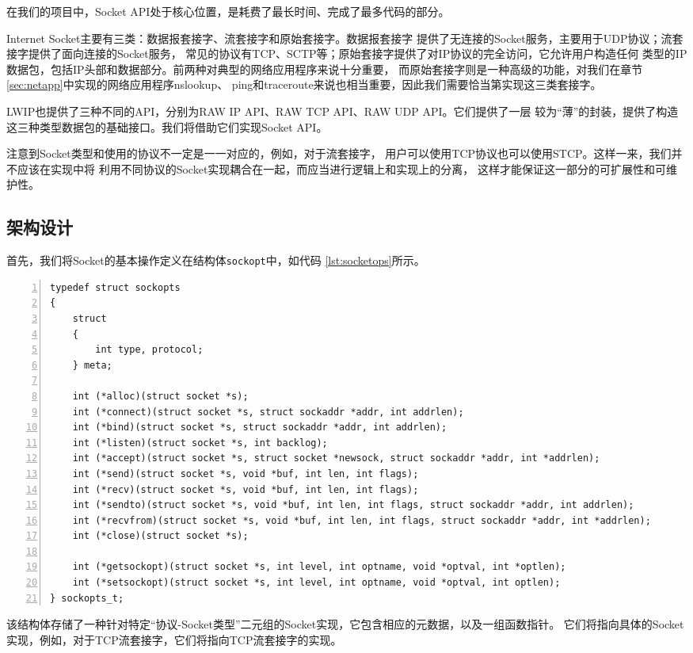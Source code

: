 \documentclass[a4paper,twoside]{ctexrep}
\begin{document}
\begin{spacing}{1.2}
在我们的项目中，Socket API处于核心位置，是耗费了最长时间、完成了最多代码的部分。

Internet Socket主要有三类：数据报套接字、流套接字和原始套接字。数据报套接字
提供了无连接的Socket服务，主要用于UDP协议；流套接字提供了面向连接的Socket服务，
常见的协议有TCP、SCTP等；原始套接字提供了对IP协议的完全访问，它允许用户构造任何
类型的IP数据包，包括IP头部和数据部分。前两种对典型的网络应用程序来说十分重要，
而原始套接字则是一种高级的功能，对我们在章节\ref{sec:netapp}中实现的网络应用程序nslookup、
ping和traceroute来说也相当重要，因此我们需要恰当第实现这三类套接字。

LWIP也提供了三种不同的API，分别为RAW IP API、RAW TCP API、RAW UDP API。它们提供了一层
较为“薄”的封装，提供了构造这三种类型数据包的基础接口。我们将借助它们实现Socket API。

注意到Socket类型和使用的协议不一定是一一对应的，例如，对于流套接字，
用户可以使用TCP协议也可以使用STCP。这样一来，我们并不应该在实现中将
利用不同协议的Socket实现耦合在一起，而应当进行逻辑上和实现上的分离，
这样才能保证这一部分的可扩展性和可维护性。

\subsection{架构设计}

首先，我们将Socket的基本操作定义在结构体\texttt{sockopt}中，如代码
\ref{lst:socketops}所示。
\begin{lstlisting}[numbers=left,style=CppStyle,caption=sockopts结构体,label={code:socketops}]
typedef struct sockopts
{
	struct
	{
		int type, protocol;
	} meta;

	int (*alloc)(struct socket *s);
	int (*connect)(struct socket *s, struct sockaddr *addr, int addrlen);
	int (*bind)(struct socket *s, struct sockaddr *addr, int addrlen);
	int (*listen)(struct socket *s, int backlog);
	int (*accept)(struct socket *s, struct socket *newsock, struct sockaddr *addr, int *addrlen);
	int (*send)(struct socket *s, void *buf, int len, int flags);
	int (*recv)(struct socket *s, void *buf, int len, int flags);
	int (*sendto)(struct socket *s, void *buf, int len, int flags, struct sockaddr *addr, int addrlen);
	int (*recvfrom)(struct socket *s, void *buf, int len, int flags, struct sockaddr *addr, int *addrlen);
	int (*close)(struct socket *s);

	int (*getsockopt)(struct socket *s, int level, int optname, void *optval, int *optlen);
	int (*setsockopt)(struct socket *s, int level, int optname, void *optval, int optlen);
} sockopts_t;
\end{lstlisting}
该结构体存储了一种针对特定“协议-Socket类型”二元组的Socket实现，它包含相应的元数据，以及一组函数指针。
它们将指向具体的Socket实现，例如，对于TCP流套接字，它们将指向TCP流套接字的实现。


\end{spacing}
\end{document}
